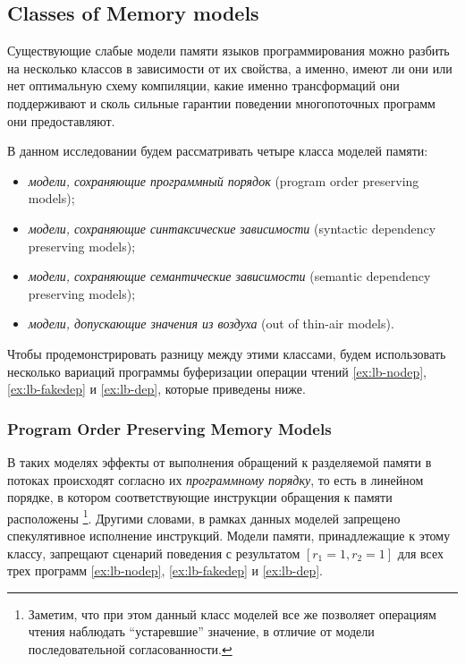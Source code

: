 \subsection{Classes of Memory models}
\label{sec:models-classes}

Существующие слабые модели памяти языков программирования 
можно разбить на несколько классов в зависимости от их свойства, а именно, 
имеют ли они или нет оптимальную схему компиляции, 
какие именно трансформаций они поддерживают 
и сколь сильные гарантии  поведении многопоточных программ
они предоставляют. 

В данном исследовании будем рассматривать четыре класса моделей памяти: 
\begin{itemize}
  \item \emph{модели, сохраняющие программный порядок}
        (program order preserving models); 
  \item \emph{модели, сохраняющие синтаксические зависимости} 
        (syntactic dependency preserving models);
  \item \emph{модели, сохраняющие семантические зависимости} 
        (semantic dependency preserving models);
  \item \emph{модели, допускающие значения из воздуха} (out of thin-air models).
\end{itemize}

 

Чтобы продемонстрировать разницу между этими классами, 
будем использовать несколько вариаций программы 
буферизации операции чтений 
\ref{ex:lb-nodep}, \ref{ex:lb-fakedep} и \ref{ex:lb-dep}, 
которые приведены ниже. 



\subsubsection*{Program Order Preserving Memory Models}

В таких  моделях 
эффекты от выполнения обращений к разделяемой памяти в потоках 
происходят согласно их \emph{программному порядку},
то есть в линейном порядке, в котором соответствующие 
инструкции обращения к памяти расположены%
\footnote{Заметим, что при этом данный класс моделей 
все же позволяет операциям чтения наблюдать ``устаревшие'' значение, 
в отличие от модели последовательной согласованности.}. 
Другими словами, в рамках данных моделей запрещено 
спекулятивное исполнение инструкций. 
Модели памяти, принадлежащие к этому классу, 
запрещают сценарий поведения с результатом ${[r_1=1,r_2=1]}$
для всех трех программ \ref{ex:lb-nodep}, \ref{ex:lb-fakedep} и \ref{ex:lb-dep}.

